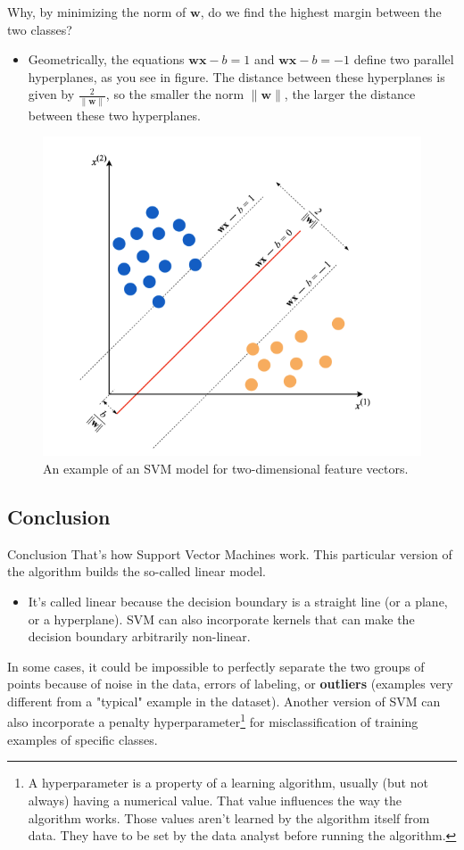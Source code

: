 \documentclass[10pt,dvipsnames]{beamer}
\begin{document}
\begin{frame}
    Why, by minimizing the norm of $\mathbf{w}$, do we find the highest margin between the two classes?
    \begin{itemize}
        \item Geometrically, the equations $\mathbf{w} \mathbf{x}-b=1$ and $\mathbf{w} \mathbf{x}-b=-1$ define two parallel hyperplanes, as you see in figure. The distance between these hyperplanes is given by $\frac{2}{\|\mathbf{w}\|}$, so the smaller the norm $\|\mathbf{w}\|$, the larger the distance between these two hyperplanes.
    \end{itemize}
    \begin{figure}[ht]
        \centering
        \includegraphics[width=0.5\linewidth]{imgs/intro_1.png}
        \caption{An example of an SVM model for two-dimensional feature vectors.}
    \end{figure}
\end{frame}

\subsection{Conclusion}
\begin{frame}{Conclusion}
    That's how Support Vector Machines work. This particular version of the algorithm builds the so-called linear model.
    \begin{itemize}
        \item It's called linear because the decision boundary is a straight line (or a plane, or a hyperplane). SVM can also incorporate kernels that can make the decision boundary arbitrarily non-linear.
    \end{itemize}
    In some cases, it could be impossible to perfectly separate the two groups of points because of noise in the data, errors of labeling, or \textbf{outliers} (examples very different from a "typical" example in the dataset). Another version of SVM can also incorporate a penalty hyperparameter\footnote{A hyperparameter is a property of a learning algorithm, usually (but not always) having a numerical value. That value inﬂuences the way the algorithm works. Those values aren’t learned by the algorithm itself from data. They have to be set by the data analyst before running the algorithm.} for misclassification of training examples of specific classes.
\end{frame}
\end{document}
